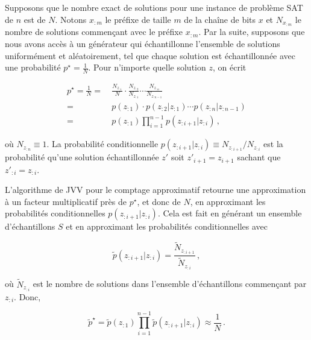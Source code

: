 Supposons que le nombre exact de solutions pour une instance de problème SAT de $n$ est de $N$. Notons $x_{:m}$ le préfixe de taille $m$ de la chaîne de bits $x$ et $N_{x_{:m}}$ le nombre de solutions commençant avec le préfixe $x_{:m}$. Par la suite, supposons que nous avons accès à un générateur qui échantillonne l'ensemble de solutions uniformément et aléatoirement, tel que chaque solution est échantillonnée avec une probabilité $p^{\star} = \frac{1}{N}$. Pour n'importe quelle solution $z$, on écrit

\begin{align}
    p^\star = \frac1N =&{\ } \frac{N_{z_{:1}}}{N} \cdot \frac{N_{z_{:2}}}{N_{z_{:1}}} \cdots \frac{N_{z_{:n}}}{N_{z_{:n-1}}} \\
    =&{\ } p(z_{:1}) \cdot p(z_{:2}|z_{:1}) \cdots p(z_{:n}|z_{:n-1}) \\
    =&{\ } p(z_{:1}) \prod_{i=1}^{n-1} p(z_{:i+1}|z_{:i}) \,,
\end{align}

où $N_{z_{:n}} \equiv 1$. La probabilité conditionnelle $p(z_{:i+1}|z_{:i}) \equiv N_{z_{:i+1}} / N_{z_{:i}}$ est la probabilité qu'une solution échantillonnée $z'$ soit $z'_{i+1} = z_{i+1}$ sachant que $z'_{:i} = z_{:i}$.  

L'algorithme de JVV pour le comptage approximatif retourne une approximation à un facteur multiplicatif près de $p^{\star}$, et donc de $N$, en approximant les probabilités conditionnelles $p(z_{:i+1}|z_{:i})$. Cela est fait en générant un ensemble d'échantillons $S$ et en approximant les probabilités conditionnelles avec

\begin{equation}
    \tilde p(z_{:i+1}|z_{:i}) = \frac{ \tilde N_{z_{:i+1}} }{ \tilde N_{z_{:i}} } \,,
\end{equation}

où $\tilde{N}_{z_{:i}}$ est le nombre de solutions dans l'ensemble d'échantillons commençant par $z_{:i}$. Donc,

\begin{equation}
    \tilde p^\star = \tilde p(z_{:1}) \prod_{i=1}^{n-1} \tilde p(z_{:i+1}|z_{:i}) \approx \frac1N \,.
\end{equation}


